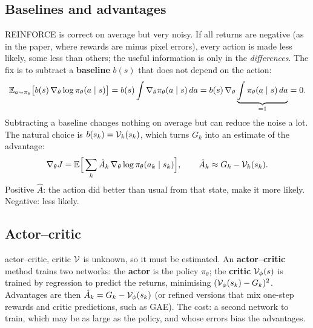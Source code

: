 \subsection{Baselines and advantages}
REINFORCE is correct on average but very noisy. If all returns are negative (as in the paper, where rewards are minus pixel errors), every action is made less likely, some less than others; the useful information is only in the \emph{differences}. The fix is to subtract a \textbf{baseline} $b(s)$ that does not depend on the action:
\begin{equation}
\mathbb{E}_{a\sim\pi_\theta}\big[b(s)\,\nabla_\theta\log\pi_\theta(a\mid s)\big]
=b(s)\int\nabla_\theta\pi_\theta(a\mid s)\,da=b(s)\,\nabla_\theta\underbrace{\int\pi_\theta(a\mid s)\,da}_{=1}=0 .
\end{equation}
Subtracting a baseline changes nothing on average but can reduce the noise a lot. The natural choice is $b(s_k)=\mathcal{V}_k(s_k)$, which turns $G_k$ into an estimate of the advantage:
\begin{equation}
\nabla_\theta J=\mathbb{E}\Big[\sum_k\hat A_k\,\nabla_\theta\log\pi_\theta(a_k\mid s_k)\Big],\qquad\hat A_k\approx G_k-\mathcal{V}_k(s_k).
\label{fpo:eq:pg-adv}
\end{equation}
Positive $\hat A$: the action did better than usual from that state, make it more likely. Negative: less likely.

\subsection{Actor--critic}
\begin{newc}{actor--critic, critic}
$\mathcal{V}$ is unknown, so it must be estimated. An \textbf{actor--critic} method trains two networks: the \textbf{actor} is the policy $\pi_\theta$; the \textbf{critic} $\mathcal{V}_\phi(s)$ is trained by regression to predict the returns, minimising $(\mathcal{V}_\phi(s_k)-G_k)^2$. Advantages are then $\hat A_k=G_k-\mathcal{V}_\phi(s_k)$ (or refined versions that mix one-step rewards and critic predictions, such as GAE). The cost: a second network to train, which may be as large as the policy, and whose errors bias the advantages.
\end{newc}

